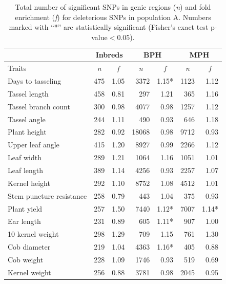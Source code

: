 \documentclass[12pt]{article}
\begin{document}
\begin{table}[!t]
  \begin{center}

    \caption[]{Total number of significant SNPs in genic regions (\emph{n}) and fold enrichment (\emph{f}) for deleterious SNPs in population A. Numbers marked with ``*'' are statistically significant (Fisher's exact test p-value$<0.05$).}
{\fontsize{10}{10}\sf
      \begin{tabular}{l|rr|rr|rr} 
\toprule
\multicolumn{1}{c}{}	&	\multicolumn{2}{c}{Inbreds}	&	\multicolumn{2}{c}{BPH}	&	\multicolumn{2}{c}{MPH}	\\	\hline 
Traits	& 	\multicolumn{1}{c}{\emph{n}} 	& 	\multicolumn{1}{c|}{\emph{f}}	& \multicolumn{1}{c}{\emph{n}} 	& 	\multicolumn{1}{c}{\emph{f}} 		& \multicolumn{1}{c}{\emph{n}} 	& 	\multicolumn{1}{c}{\emph{f}} 		\\	\hline \hline  
Days to tasseling 	& 	475 	& 	1.05 	& 	3372 	& 	1.15* 	& 	1123 	& 	1.12	\\
Tassel length 	& 	458 	& 	0.81 	& 	297 	& 	1.21 	& 	365 	& 	1.16	\\
Tassel branch count	 	& 	300 	& 	0.98 	& 	4077 	& 	0.98 	& 	1257 	& 	1.12	\\
Tassel angle 	& 	244 	& 	1.11 	& 	490 	& 	0.93 	& 	646 	& 	1.18	\\
Plant height 	& 	282 	& 	0.92 	& 	18068 	& 	0.98 	& 	9712 	& 	0.93	\\
Upper leaf angle 	& 	415 	& 	1.20 	& 	8927 	& 	0.99 	& 	2266 	& 	1.12	\\
Leaf width  	& 	289 	& 	1.21 	& 	1064 	& 	1.16 	& 	1051 	& 	1.01	\\
Leaf length 	& 	389 	& 	1.14 	& 	4256 	& 	0.93 	& 	2257 	& 	1.07	\\
Kernel height 	& 	292 	& 	1.10 	& 	8752 	& 	1.08 	& 	4512 	& 	1.01	\\
Stem puncture resistance 	& 	258 	& 	0.79 	& 	443 	& 	1.04 	& 	375 	& 	0.93	\\
Plant yield  	& 	257 	& 	1.50 	& 	7440 	& 	1.12* 	& 	7007 	& 	1.14*	\\
Ear length 	& 	231 	& 	0.89 	& 	605 	& 	1.11* 	& 	907 	& 	1.00	\\	
10 kernel weight 	& 	298 	& 	1.29 	& 	709 	& 	1.15 	& 	761 	& 	1.30	\\
Cob diameter 	& 	219 	& 	1.04 	& 	4363 	& 	1.16* 	& 	405 	& 	0.88	\\
Cob weight  	& 	228 	& 	1.09 	& 	1746 	& 	0.93 	& 	519 	& 	0.69	\\
Kernel weight 	& 	256 	& 	0.88 	& 	3781 	& 	0.98 	& 	2045 	& 	0.95	\\
\bottomrule
      \end{tabular}
}
    \label{popA_sig_enrichment}  
  \end{center}
\end{table}
\end{document}
